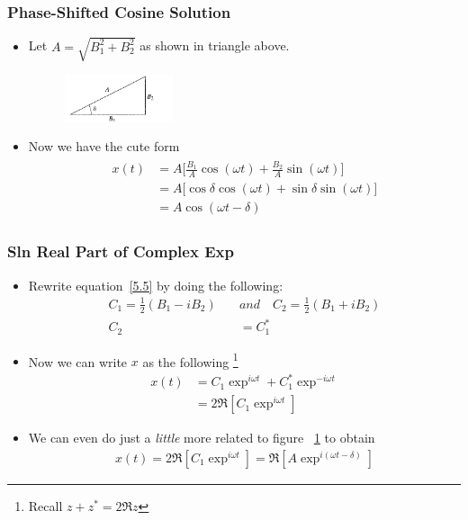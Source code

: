 \documentclass[10pt, twocolumn]{article}
\begin{document}
\subsubsection{Phase-Shifted Cosine Solution}
\begin{itemize}
	\item Let $A = \sqrt{B_1^2 + B_2^2}$ as shown in triangle above. 
		\begin{figure}[t!]
			\centering
			\includegraphics[width=0.3\textwidth]{Triangle.PNG}
			\caption{}
			\label{Triangle}
		\end{figure}
	\item Now we have the cute form
	\begin{align}
	\begin{split}
		x(t) &= A \bigg[\frac{B_1}{A}\cos(\omega t) +  \frac{B_2}{A} \sin(\omega t) \bigg] \\
		&= A \bigg[\cos\delta\cos(\omega t) +  \sin\delta \sin(\omega t) \bigg]  \\
		&= A \cos(\omega t - \delta) 
	\end{split}
	\label{5.11}
	\end{align}
\end{itemize}

\subsubsection{Sln Real Part of Complex Exp}
\begin{itemize}
	\item Rewrite equation~\ref{5.5} by doing the following:
	\begin{align}
		C_1 = \frac{1}{2} (B_1 - i B_2) \quad &and \quad C_2 = \frac{1}{2} (B_1 + i B_2) \\
		C_2 &= C_1^* 
	\end{align}
	\item Now we can write $x$ as the following \footnote{Recall $z + z^* = 2\Re z$}
	\begin{align}
		x(t) &= C_1 \exp^{i\omega t}  + C_1^* \exp^{-i\omega t} \\
		&= 2 \Re[C_1 \exp^{i \omega t}]
	\end{align}
	\item We can even do just a \textit{little} more  related to figure ~\ref{Triangle} to obtain
	\begin{align}
		x(t) = 2 \Re[C_1 \exp^{i \omega t}] = \Re[A \exp^{i (\omega t - \delta)}]
	\end{align}
\end{itemize}
\end{document}
